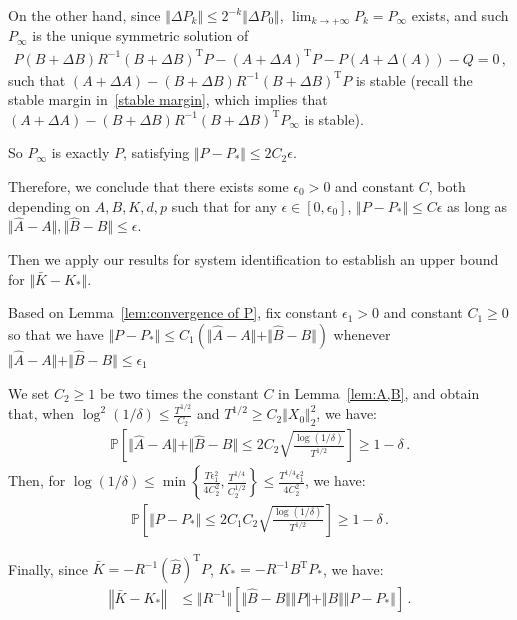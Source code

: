 \documentclass{article}
\theoremstyle{definition}
\begin{document}
On the other hand, since $\Vert \Delta P_{k}\Vert \leq 2^{-k}\Vert \Delta P_{0}\Vert $, $\lim_{k\to+\infty}P_{k}=P_{\infty}$ exists, and such $P_{\infty}$ is the unique symmetric solution of 
\begin{align*}
P(B+\Delta B)R^{-1}(B+\Delta B)^{\mathrm{T}}P-(A+\Delta A)^{\mathrm{T}}P-P(A+\Delta(A))-Q=0\,,
\end{align*}
such that $(A+\Delta A)-(B+\Delta B)R^{-1}(B+\Delta B)^{\mathrm{T}}P$ is stable (recall the stable margin in~\eqref{stable margin}, which implies that $(A+\Delta A)-(B+\Delta B)R^{-1}(B+\Delta B)^{\mathrm{T}}P_{\infty}$ is stable). 

So $P_{\infty}$ is exactly $P$, satisfying $\Vert P-P_{*}\Vert \leq 2C_{2}\epsilon$.

Therefore, we conclude that there exists some $\epsilon_{0}>0$ and constant $C$, both depending on $A,B,K,d,p$ such that for any $\epsilon\in[0,\epsilon_{0}]$, $\Vert P-P_{*}\Vert \leq C\epsilon$ as long as $\Vert \hat{A}-A\Vert ,\Vert \hat{B}-B\Vert \leq \epsilon$.

Then we apply our results for system identification to establish an upper bound for $\Vert \bar{K}-K_{*}\Vert$.

Based on Lemma~\ref{lem:convergence of P}, fix constant $\epsilon_{1}>0$ and constant $C_{1}\geq 0$ so that we have $\Vert P-P_{*}\Vert\leq C_{1}\left(\Vert\hat{A}-A\Vert+\Vert\hat{B}-B\Vert\right)$ whenever $\Vert\hat{A}-A\Vert+\Vert\hat{B}-B\Vert\leq \epsilon_{1}$

We set $C_{2}\geq 1$ be two times the constant $C$ in Lemma~\ref{lem:A,B}, and obtain that, when $\log^{2}(1/\delta)\leq \frac{T^{1/2}}{C_{2}}$ and $T^{1/2}\geq C_{2}\Vert X_{0}\Vert^{2}_{2}$, we have:
\begin{align*}
    \mathbb{P}\left[\Vert\hat{A}-A\Vert+\Vert \hat{B}-B\Vert \leq 2C_{2}\sqrt{\frac{\log(1/\delta)}{T^{1/2}}}\right]\geq 1-\delta\,.
\end{align*}
Then, for $\log(1/\delta)\leq \min\left\{\frac{T\epsilon_{1}^{2}}{4C^{2}_{2}},\frac{T^{1/4}}{C^{1/2}_{2}}\right\}\leq \frac{T^{1/4}\epsilon^{2}_{1}}{4C_{2}^{2}}$, we have:
\begin{align}\label{eq: upper bound P}
\mathbb{P}\left[\Vert P-P_{*}\Vert \leq 2C_{1}C_{2}\sqrt{\frac{\log(1/\delta)}{T^{1/2}}}\right]\geq 1-\delta\,.    
\end{align}

Finally, since $\bar{K}=-R^{-1}(\hat{B})^{\mathrm{T}}P$, $K_{*}=-R^{-1}B^{\mathrm{T}}P_{*}$, we have:
\begin{align*}
\left\Vert \bar{K}-K_{*}\right\Vert&\leq \Vert R^{-1}\Vert \left[\Vert \hat{B}-B\Vert \Vert P\Vert +\Vert B\Vert \Vert P-P_{*}\Vert   \right]\,.  
\end{align*}
\end{document}
